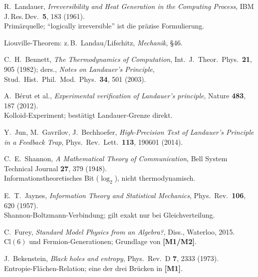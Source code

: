 \begin{description}[leftmargin=3.5em,style=sameline,itemsep=0.4em]

\item[{[B1]}] R.~Landauer, \textit{Irreversibility and Heat Generation in the
  Computing Process}, IBM J.\,Res.\,Dev.\ \textbf{5}, 183 (1961). \\
  Primärquelle; ``logically irreversible'' ist die präzise Formulierung.

\item[{[B2]}] Liouville-Theorem: z.\,B.\ Landau/Lifschitz,
  \textit{Mechanik}, §46.

\item[{[B3]}] C.~H.~Bennett, \textit{The Thermodynamics of Computation},
  Int.\ J.\ Theor.\ Phys.\ \textbf{21}, 905 (1982); ders.,
  \textit{Notes on Landauer's Principle},
  Stud.\ Hist.\ Phil.\ Mod.\ Phys.\ \textbf{34}, 501 (2003).

\item[{[B4]}] A.~Bérut et al., \textit{Experimental verification of
  Landauer's principle}, Nature \textbf{483}, 187 (2012). \\
  Kolloid-Experiment; bestätigt Landauer-Grenze direkt.

\item[{[B5]}] Y.~Jun, M.~Gavrilov, J.~Bechhoefer,
  \textit{High-Precision Test of Landauer's Principle in a Feedback Trap},
  Phys.\ Rev.\ Lett.\ \textbf{113}, 190601 (2014).

\item[{[B6]}] C.~E.~Shannon, \textit{A Mathematical Theory of Communication},
  Bell System Technical Journal \textbf{27}, 379 (1948). \\
  Informationstheoretisches Bit ($\log_2$), nicht thermodynamisch.

\item[{[B7]}] E.~T.~Jaynes, \textit{Information Theory and Statistical Mechanics},
  Phys.\ Rev.\ \textbf{106}, 620 (1957). \\
  Shannon-Boltzmann-Verbindung; gilt exakt nur bei Gleichverteilung.

\item[{[B8]}] C.~Furey, \textit{Standard Model Physics from an Algebra?},
  Diss., Waterloo, 2015. \\
  $\mathrm{Cl}(6)$ und Fermion-Generationen; Grundlage von \textbf{[M1/M2]}.

\item[{[B9]}] J.~Bekenstein, \textit{Black holes and entropy},
  Phys.\ Rev.\ D \textbf{7}, 2333 (1973). \\
  Entropie-Flächen-Relation; eine der drei Brücken in \textbf{[M1]}.


\end{description}
